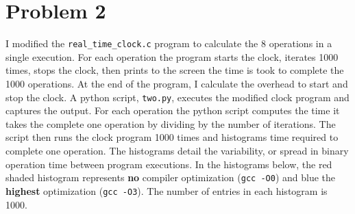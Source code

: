 \documentclass[singlepage,notitlepage,nofootinbib,11pt]{revtex4-1}
\begin{document}
\section{Problem 2}
I modified the \verb|real_time_clock.c| program to calculate the 8 operations in a single execution. For each operation the program starts the clock, iterates 1000 times, stops the clock, then prints to the screen the time is took to complete the 1000 operations. At the end of the program, I calculate the overhead to start and stop the clock. A python script, \verb|two.py|, executes the modified clock program and captures the output. For each operation the python script computes the time it takes the complete one operation by dividing by the number of iterations. The script then runs the clock program 1000 times and histograms time required to complete one operation. The histograms detail the variability, or spread in binary operation time between program executions. In the histograms below, the red shaded histogram represents {\bf no} compiler optimization (\verb|gcc -O0|) and blue the {\bf highest} optimization (\verb|gcc -O3|). The number of entries in each histogram is 1000.
\end{document}
